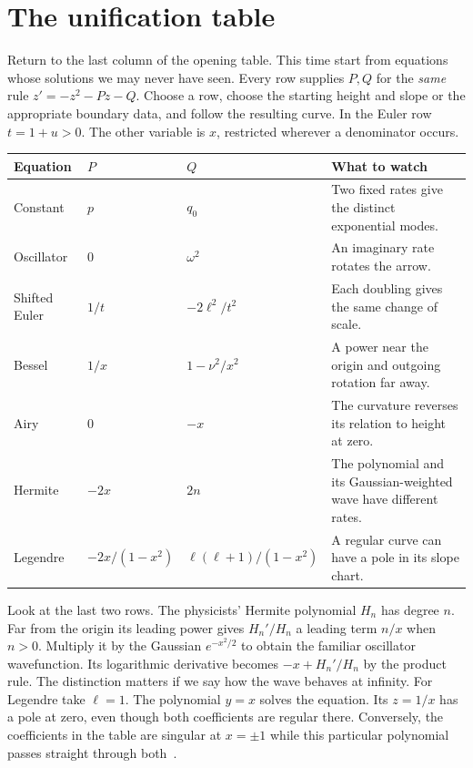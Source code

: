 \documentclass[11pt,a4paper]{amsart}
\theoremstyle{definition}
\theoremstyle{remark}
\begin{document}
\section{The unification table}\label{sec:table}
Return to the last column of the opening table. This time start from equations whose solutions we may never have seen. Every row supplies \(P,Q\) for the \emph{same} rule \(z'=-z^2-Pz-Q\). Choose a row, choose the starting height and slope or the appropriate boundary data, and follow the resulting curve. In the Euler row \(t=1+u>0\). The other variable is \(x\), restricted wherever a denominator occurs.
\begin{center}\small
\begin{tabularx}{\linewidth}{@{}l l l Y@{}}
\toprule
Equation & \(P\) & \(Q\) & What to watch\\
\midrule
Constant & \(p\) & \(q_0\) & Two fixed rates give the distinct exponential modes.\\
Oscillator & \(0\) & \(\omega^2\) & An imaginary rate rotates the arrow.\\
Shifted Euler & \(1/t\) & \(-2\ell^2/t^2\) & Each doubling gives the same change of scale.\\
Bessel & \(1/x\) & \(1-\nu^2/x^2\) & A power near the origin and outgoing rotation far away.\\
Airy & \(0\) & \(-x\) & The curvature reverses its relation to height at zero.\\
Hermite & \(-2x\) & \(2n\) & The polynomial and its Gaussian-weighted wave have different rates.\\
Legendre & \(-2x/(1-x^2)\) & \(\ell(\ell+1)/(1-x^2)\) & A regular curve can have a pole in its slope chart.\\
\bottomrule
\end{tabularx}
\end{center}

Look at the last two rows. The physicists' Hermite polynomial \(H_n\) has degree \(n\). Far from the origin its leading power gives \(H_n'/H_n\) a leading term \(n/x\) when \(n>0\). Multiply it by the Gaussian \(e^{-x^2/2}\) to obtain the familiar oscillator wavefunction. Its logarithmic derivative becomes \(-x+H_n'/H_n\) by the product rule. The distinction matters if we say how the wave behaves at infinity. For Legendre take \(\ell=1\). The polynomial \(y=x\) solves the equation. Its \(z=1/x\) has a pole at zero, even though both coefficients are regular there. Conversely, the coefficients in the table are singular at \(x=\pm1\) while this particular polynomial passes straight through both~\cite{NISTPoly}.
\end{document}
